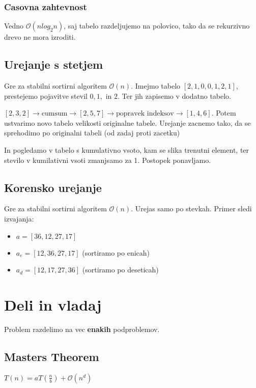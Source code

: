 \documentclass{article}
\begin{document}
\begin{multicols}{2}
\subsubsection{Casovna zahtevnost}
Vedno $\mathcal{O}(nlog_2n)$, saj tabelo razdeljujemo na polovico, tako da se rekurzivno drevo ne mora izroditi.

\subsection{Urejanje s stetjem}
Gre za stabilni sortirni algoritem $\mathcal{O}(n)$.
Imejmo tabelo $[2, 1, 0, 0, 1,  2, 1]$, prestejemo pojavitve stevil $0, 1, \text{ in } 2$. Ter jih zapisemo v dodatno tabelo.

$[2, 3, 2] \rightarrow \text{cumsum} \rightarrow [2, 5 , 7] \rightarrow  \text{popravek indeksov} \rightarrow [1, 4, 6]$.
Potem ustvarimo novo tabelo velikosti originalne tabele. Urejanje zacnemo tako, da se sprehodimo po originalni tabeli (od zadaj proti zacetku)

In pogledamo v tabelo s kumulativno vsoto, kam se slika trenutni element, ter stevilo v kumilativni vsoti zmanjsamo za 1. Postopek ponavljamo.

\subsection{Korensko urejanje}
Gre za stabilni sortirni algoritem $\mathcal{O}(n)$.
Urejas samo po stevkah.
Primer sledi izvajanja:
\begin{itemize}
    \item $a = [36, 12, 27, 17]$
    \item $a_e = [12, 36, 27, 17]$ (sortiramo po enicah)
    \item $a_d = [12, 17, 27, 36]$ (sortiramo po deseticah)
\end{itemize}

\section{Deli in vladaj}
Problem razdelimo na vec \textbf{enakih} podproblemov. 

\subsection{Masters Theorem}

\begin{center}
    \begin{math}
        T(n) = a T(\frac{n}{b}) + \mathcal{O}(n^d)
    \end{math}
\end{center}


\end{multicols}
\end{document}
